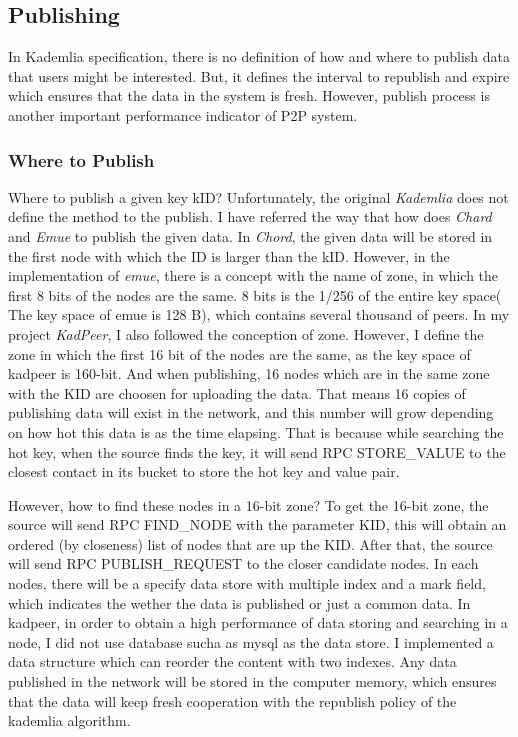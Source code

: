 \subsection{Publishing}
{
In Kademlia specification, there is no definition of how and where to publish data that users might be interested. But, it defines the interval to republish and expire which ensures that the data in the system is fresh.
However, publish process is another important performance indicator of P2P system.
}

\subsubsection{Where to Publish}
{
Where to publish a given key kID?
Unfortunately, the original \emph{Kademlia} does not define the method to the publish.
I have referred the way that how does \emph{Chard} and \emph{Emue} to publish the given data.
In \emph{Chord}, the given data will be stored in the first node with which the ID is larger than the kID.
However, in the implementation of \emph{emue}, there is a concept with the name of zone, in which the first 8 bits of the nodes are the same.
8 bits is the 1/256 of the entire key space( The key space of emue is 128 B), which contains several thousand of peers.  
In my project \emph{KadPeer}, I also followed the conception of zone.
However, I define the zone in which the first 16 bit of the nodes are the same, as the key space of kadpeer is 160-bit.
And when publishing, 16 nodes which are in the same zone with the KID are choosen for uploading the data.
That means 16 copies of publishing data will exist in the network, and this number will grow depending on how hot this data is as the time elapsing.
That is because while searching the hot key, when the source finds the key, it will send RPC STORE\_VALUE to the closest contact in its bucket to store the hot key and value pair.

However, how to find these nodes in a 16-bit zone?
To get the 16-bit zone, the source will send RPC FIND\_NODE with the parameter KID, this will obtain an ordered (by closeness) list of nodes that are up the KID.
After that, the source will send RPC PUBLISH\_REQUEST to the closer candidate nodes.
In each nodes, there will be a specify data store with multiple index and a mark field, which indicates the wether the data is published or just a common data.
In kadpeer, in order to obtain a high performance of data storing and searching in a node, I did not use  database sucha as mysql as the data store.
I implemented a data structure which can reorder the content with two indexes.
Any data published in the network will be stored in the computer memory, which ensures that the data will keep fresh cooperation with the republish policy of the kademlia algorithm.

}
